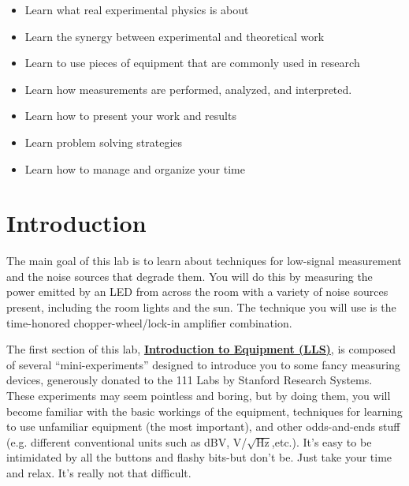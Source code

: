 \documentclass{../lab}
\begin{document}
\begin{itemize}
    \item Learn what real experimental physics is about

    \item Learn the synergy between experimental and theoretical work

    \item Learn to use pieces of equipment that are commonly used in research

    \item Learn how measurements are performed, analyzed, and interpreted.

    \item Learn how to present your work and results

    \item Learn problem solving strategies

    \item Learn how to manage and organize your time

\end{itemize}

\section{Introduction}

The main goal of this lab is to learn about techniques for low-signal measurement and the noise sources that degrade them. You will do this by measuring the power emitted by an LED from across the room with a variety of noise sources present, including the room lights and the sun. The technique you will use is the time-honored chopper-wheel/lock-in amplifier combination.

The first section of this lab, \href{http://dev-physicsadv.pantheon.berkeley.edu/IntroductiontoEquipment}{\textbf{Introduction to Equipment (LLS)}}, is composed of several ``mini-experiments'' designed to introduce you to some fancy measuring devices, generously donated to the 111 Labs by Stanford Research Systems. These experiments may seem pointless and boring, but by doing them, you will become familiar with the basic workings of the equipment, techniques for learning to use unfamiliar equipment (the most important), and other odds-and-ends stuff (e.g. different conventional units such as dBV, V/${\sqrt{\textrm{Hz}}}$,etc.). It's easy to be intimidated by all the buttons and flashy bits-but don't be. Just take your time and relax. It's really not that difficult.
\end{document}
